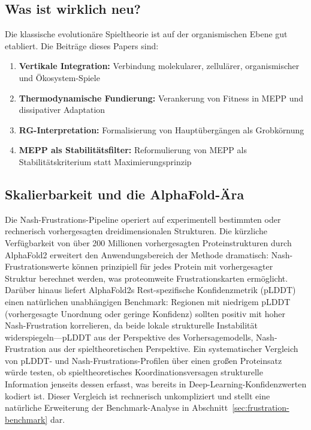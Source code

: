 \documentclass[12pt,a4paper]{article}
\theoremstyle{remark}
\begin{document}
\subsection{Was ist wirklich neu?}

Die klassische evolution\"are Spieltheorie ist auf der organismischen Ebene gut etabliert. Die Beitr\"age dieses Papers sind:
\begin{enumerate}
    \item \textbf{Vertikale Integration:} Verbindung molekularer, zellul\"arer, organismischer und \"Okosystem-Spiele
    \item \textbf{Thermodynamische Fundierung:} Verankerung von Fitness in MEPP und dissipativer Adaptation
    \item \textbf{RG-Interpretation:} Formalisierung von Haupt\"uberg\"angen als Grobk\"ornung
    \item \textbf{MEPP als Stabilit\"atsfilter:} Reformulierung von MEPP als Stabilit\"atskriterium statt Maximierungsprinzip
\end{enumerate}

\subsection{Skalierbarkeit und die AlphaFold-\"Ara}

Die Nash-Frustrations-Pipeline operiert auf experimentell bestimmten oder rechnerisch vorhergesagten dreidimensionalen Strukturen. Die k\"urzliche Verf\"ugbarkeit von \"uber 200 Millionen vorhergesagten Proteinstrukturen durch AlphaFold2 \citep{JumperAF2021} erweitert den Anwendungsbereich der Methode dramatisch: Nash-Frustrationswerte k\"onnen prinzipiell f\"ur jedes Protein mit vorhergesagter Struktur berechnet werden, was proteomweite Frustrationskarten erm\"oglicht. Dar\"uber hinaus liefert AlphaFold2s Rest-spezifische Konfidenzmetrik (pLDDT) einen nat\"urlichen unabh\"angigen Benchmark: Regionen mit niedrigem pLDDT (vorhergesagte Unordnung oder geringe Konfidenz) sollten positiv mit hoher Nash-Frustration korrelieren, da beide lokale strukturelle Instabilit\"at widerspiegeln---pLDDT aus der Perspektive des Vorhersagemodells, Nash-Frustration aus der spieltheoretischen Perspektive. Ein systematischer Vergleich von pLDDT- und Nash-Frustrations-Profilen \"uber einen gro\ss{}en Proteinsatz w\"urde testen, ob spieltheoretisches Koordinationsversagen strukturelle Information jenseits dessen erfasst, was bereits in Deep-Learning-Konfidenzwerten kodiert ist. Dieser Vergleich ist rechnerisch unkompliziert und stellt eine nat\"urliche Erweiterung der Benchmark-Analyse in Abschnitt~\ref{sec:frustration-benchmark} dar.
\end{document}
